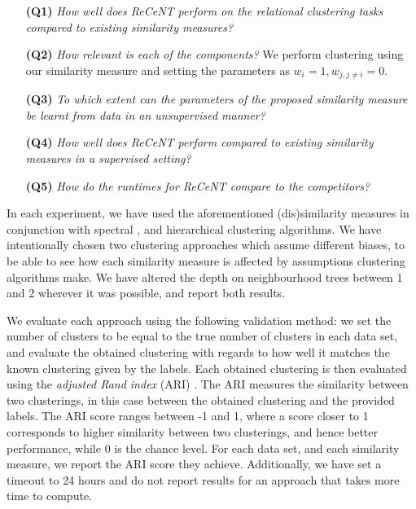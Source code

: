 \begin{itemize}
    \item[\textbf{(Q1)}]\textit{How well does ReCeNT perform on the relational clustering tasks compared to existing similarity measures?} 
    
    \item[\textbf{(Q2)}] \textit{How relevant is each of the components?}  We perform clustering using our similarity measure and setting the parameters as $w_i = 1, w_{j, j \not=i}=0$.
    
    \item[\textbf{(Q3)}] \textit{To which extent can the parameters of the proposed similarity measure  be learnt from data in an unsupervised manner?}
    
    \item[\textbf{(Q4)}] \textit{How well does ReCeNT perform compared to existing similarity measures in a supervised setting?}
    
    \item[\textbf{(Q5)}] \textit{How do the runtimes for ReCeNT compare to the competitors?} 
\end{itemize}








In each experiment, we have used the aforementioned (dis)similarity measures in conjunction with spectral \cite{Spectral},  and hierarchical \cite{Agglomerative} clustering algorithms.
We have intentionally chosen two clustering approaches which assume different biases, to be able to see how each similarity measure is affected by assumptions clustering algorithms make.
We have altered the depth on neighbourhood trees between 1 and 2 wherever it was possible, and report both results.




We evaluate each approach using the following validation method: we set the number of clusters to be equal to the true number of clusters in each data set, and evaluate the obtained clustering with regards to how well it matches the known clustering given by the labels.
Each obtained clustering is then evaluated using the \textit{adjusted Rand index} (ARI)  \cite{Rand71,MoreyARI}. 
The ARI measures the similarity between two clusterings, in this case between the obtained clustering and the provided labels.
The ARI score ranges between -1 and 1, where a score closer to 1 corresponds to higher similarity between two clusterings, and hence better performance, while 0 is the chance level.
For each data set, and each similarity measure, we report the ARI score they achieve.
Additionally, we have set a timeout to 24 hours and do not report results for an approach that takes more time to compute. 





